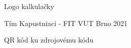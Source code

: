 \documentclass[a4paper, 11pt]{article}
\begin{document}
        \thispagestyle{empty}
        \begin{figure}[t]
    	    \centering
    	        \caption{Logo kalkulačky}
    	\end{figure}
    	\begin{figure}[h]
            \centering
    	        \caption{QR kód ku zdrojovému kódu}
    	        \vspace{30mm}
    	        {\small
			    Tím Kapustniaci - FIT VUT Brno \hfill 2021
		        }
    	\end{figure}
\end{document}
